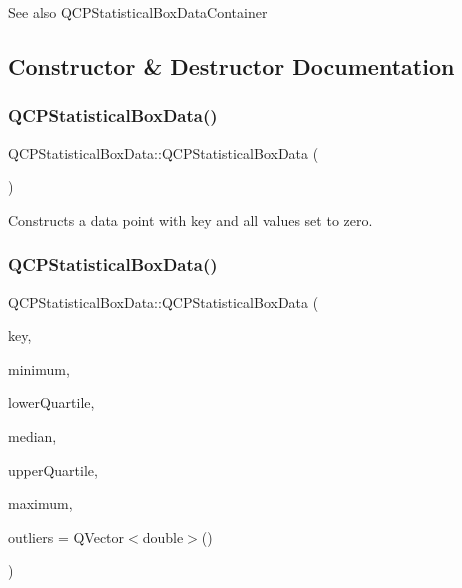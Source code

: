 \begin{DoxySeeAlso}{See also}
Q\+C\+P\+Statistical\+Box\+Data\+Container 
\end{DoxySeeAlso}


\subsection{Constructor \& Destructor Documentation}
\mbox{\label{classQCPStatisticalBoxData_ab96c4b93670a8dcac8a3d4080fd722ee}} 
\subsubsection{\texorpdfstring{Q\+C\+P\+Statistical\+Box\+Data()}{QCPStatisticalBoxData()}\hspace{0.1cm}{\footnotesize\ttfamily [1/2]}}
{\footnotesize\ttfamily Q\+C\+P\+Statistical\+Box\+Data\+::\+Q\+C\+P\+Statistical\+Box\+Data (\begin{DoxyParamCaption}{ }\end{DoxyParamCaption})}

Constructs a data point with key and all values set to zero. \mbox{\label{classQCPStatisticalBoxData_a66b0c6d39765d0feb49c286fba4e4ef5}} 
\subsubsection{\texorpdfstring{Q\+C\+P\+Statistical\+Box\+Data()}{QCPStatisticalBoxData()}\hspace{0.1cm}{\footnotesize\ttfamily [2/2]}}
{\footnotesize\ttfamily Q\+C\+P\+Statistical\+Box\+Data\+::\+Q\+C\+P\+Statistical\+Box\+Data (\begin{DoxyParamCaption}\item[{double}]{key,  }\item[{double}]{minimum,  }\item[{double}]{lower\+Quartile,  }\item[{double}]{median,  }\item[{double}]{upper\+Quartile,  }\item[{double}]{maximum,  }\item[{const Q\+Vector$<$ double $>$ \&}]{outliers = {\ttfamily QVector$<$double$>$()} }\end{DoxyParamCaption})}

